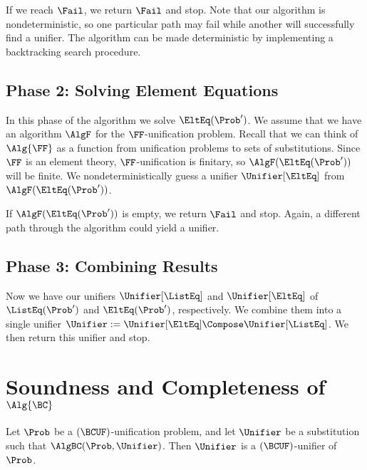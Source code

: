 If we reach $\Fail$, we return $\Fail$ and stop. Note that our algorithm is
nondeterministic, so one particular path may fail while another will
successfully find a unifier. The algorithm can be made deterministic by
implementing a backtracking search procedure.

\subsection*{Phase 2: Solving Element Equations}

In this phase of the algorithm we solve $\EltEq(\Prob')$. We assume that we
have an algorithm $\AlgF$ for the $\FF$-unification problem. Recall that we can
think of $\Alg{\FF}$ as a function from unification problems to sets of
substitutions.  Since $\FF$ is an element theory, $\FF$-unification is
finitary, so $\AlgF(\EltEq(\Prob'))$ will be finite. We nondeterministically
guess a unifier $\Unifier[\EltEq]$ from $\AlgF(\EltEq(\Prob'))$.

If $\AlgF(\EltEq(\Prob'))$ is empty, we return $\Fail$ and stop. Again, a
different path through the algorithm could yield a unifier.

\subsection*{Phase 3: Combining Results}

Now we have our unifiers $\Unifier[\ListEq]$ and $\Unifier[\EltEq]$ of
$\ListEq(\Prob')$ and $\EltEq(\Prob')$, respectively. We combine them into a
single unifier $\Unifier := \Unifier[\EltEq] \Compose \Unifier[\ListEq]$. We
then return this unifier and stop.



\section{Soundness and Completeness of $\Alg{\BC}$}\label{sec:bc-sound-complete}

\begin{Theorem}
    Let $\Prob$ be a $(\BCUF)$-unification problem, and let $\Unifier$ be a
    substitution such that $\AlgBC(\Prob, \Unifier)$. Then $\Unifier$ is a
    $(\BCUF)$-unifier of $\Prob$.
\end{Theorem}

